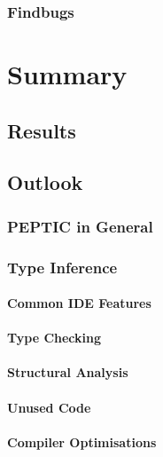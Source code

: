 \documentclass[12pt,halfparskip]{scrreprt}
\begin{document}
\subsection{Findbugs}


\chapter{Summary}

\section{Results}



\section{Outlook}

\subsection{PEPTIC in General}


\subsection{Type Inference}


\subsubsection{Common IDE Features}


\subsubsection{Type Checking}


\subsubsection{Structural Analysis}


\subsubsection{Unused Code}


\subsubsection{Compiler Optimisations}
\end{document}
